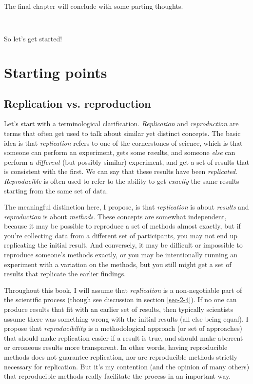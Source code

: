 \documentclass{book}
\begin{document}
The final chapter will conclude with some parting thoughts.

~

So let's get started!
\chapter{Starting points}
\label{sec-2}
\label{starting}
\section{Replication vs. reproduction}
\label{sec-2-1}
\label{replication-v-reproduction}

Let's start with a terminological clarification.  \emph{Replication} and \emph{reproduction} are terms that often get used to talk about similar yet distinct concepts.  The basic idea is that \emph{replication} refers to one of the cornerstones of science, which is that someone can perform an experiment, gets some results, and someone \emph{else} can perform a \emph{different} (but possibly similar) experiment, and get a set of results that is consistent with the first. We can say that these results have been \emph{replicated}.  \emph{Reproducible} is often used to refer to the ability to get \emph{exactly} the same results starting from the same set of data.

The meaningful distinction here, I propose, is that \emph{replication} is about \emph{results} and \emph{reproduction} is about \emph{methods}.  These concepts are somewhat independent, because it may be possible to reproduce a set of methods almost exactly, but if you're collecting data from a different set of participants, you may not end up replicating the initial result.  And conversely, it may be difficult or impossible to reproduce someone's methods exactly, or you may be intentionally running an experiment with a variation on the methods, but you still might get a set of results that replicate the earlier findings.

Throughout this book, I will assume that \emph{replication} is a non-negotiable part of the scientific process (though see discussion in section \ref{sec-2-4}).  If no one can produce results that fit with an earlier set of results, then typically scientists assume there was something wrong with the initial results (all else being equal).  I propose that \emph{reproducibility} is a methodological approach (or set of approaches) that should make replication easier if a result is true, and should make aberrent or erroneous results more transparent.  In other words, having reproducible methods does not guarantee replication, nor are reproducible methods strictly necessary for replication. But it's my contention (and the opinion of many others) that reproducible methods really facilitate the process in an important way.
\end{document}
